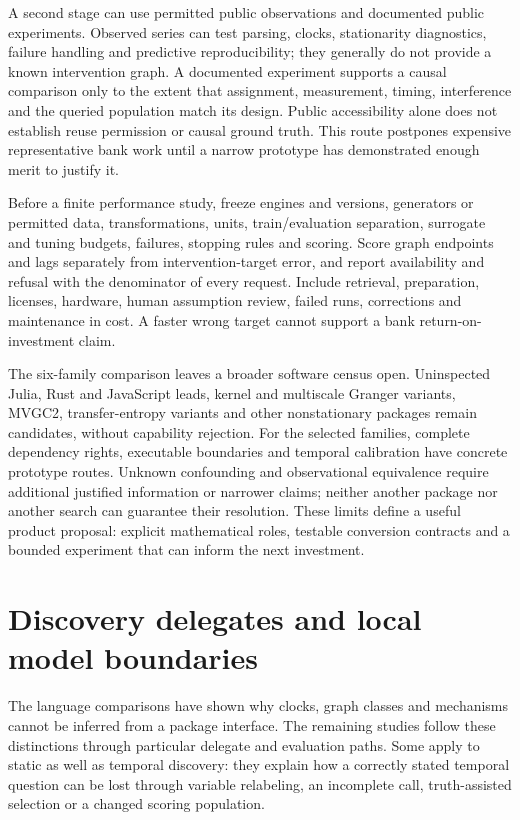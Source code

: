 A second stage can use permitted public observations and documented public
experiments. Observed series can test parsing, clocks, stationarity diagnostics,
failure handling and predictive reproducibility; they generally do not
provide a known intervention graph. A documented experiment supports a
causal comparison only to the extent that assignment, measurement, timing,
interference and the queried population match its design. Public accessibility
alone does not establish reuse permission or causal ground truth.
This route postpones expensive representative bank work until a narrow
prototype has demonstrated enough merit to justify it.
\citep{exec17_temporal_contract}

Before a finite performance study, freeze engines and versions, generators
or permitted data, transformations, units, train/evaluation separation,
surrogate and tuning budgets, failures, stopping rules and scoring.
Score graph endpoints and lags separately from intervention-target error,
and report availability and refusal with the denominator of every request.
Include retrieval, preparation, licenses, hardware, human assumption review,
failed runs, corrections and maintenance in cost. A faster wrong target
cannot support a bank return-on-investment claim.
\citep{exec17_temporal_contract}

The six-family comparison leaves a broader software census open.
Uninspected Julia, Rust and JavaScript leads, kernel and multiscale Granger
variants, MVGC2, transfer-entropy variants and other nonstationary packages
remain candidates, without capability rejection. For the selected families,
complete dependency rights, executable boundaries and temporal calibration
have concrete prototype routes. Unknown confounding and observational
equivalence require additional justified information or narrower claims;
neither another package nor another search can guarantee their resolution.
These limits define a useful product proposal: explicit mathematical roles,
testable conversion contracts and a bounded experiment that can inform the
next investment.
\citep{exec17_temporal_contract}
\label{exec17:other-temporal-end}


\section[Discovery delegates and local model boundaries]{Discovery delegates and local model boundaries}
\label{sec:exec28-bp}
The language comparisons have shown why clocks, graph classes and mechanisms
cannot be inferred from a package interface. The remaining studies follow
these distinctions through particular delegate and evaluation paths. Some
apply to static as well as temporal discovery: they explain how a correctly
stated temporal question can be lost through variable relabeling, an
incomplete call, truth-assisted selection or a changed scoring population.

